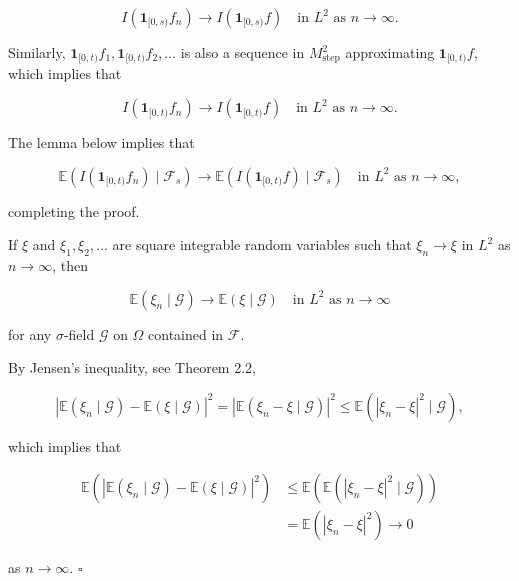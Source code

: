 \begin{Proof}
\begin{enumerate}
\begin{equation}
I\left(\mathbf{1}_{[0,s)} f_n\right) \to I\left(\mathbf{1}_{[0,s)} f\right) \quad \text{in } L^2 \text{ as } n \to \infty.
\end{equation}

Similarly, $\mathbf{1}_{[0,t)} f_1, \mathbf{1}_{[0,t)} f_2, \ldots$ is also a sequence in $M_{\mathrm{step}}^2$ approximating $\mathbf{1}_{[0,t)} f$, which implies that

\begin{equation}
I\left(\mathbf{1}_{[0,t)} f_n\right) \to I\left(\mathbf{1}_{[0,t)} f\right) \quad \text{in } L^2 \text{ as } n \to \infty.
\end{equation}

The lemma below implies that

\begin{equation}
\mathbb{E}\left(I\left(\mathbf{1}_{[0,t)} f_n\right) \mid \mathcal{F}_s\right) \to \mathbb{E}\left(I\left(\mathbf{1}_{[0,t)} f\right) \mid \mathcal{F}_s\right) \quad \text{in } L^2 \text{ as } n \to \infty,
\end{equation}

completing the proof.
\end{enumerate}
\end{Proof}

\begin{Lemma}
\label{lm:7.1}
If $\xi$ and $\xi_1, \xi_2, \ldots$ are square integrable random variables such that $\xi_n \to \xi$ in $L^2$ as $n \to \infty$, then

\begin{equation}
\mathbb{E}\left(\xi_n \mid \mathcal{G}\right) \to \mathbb{E}\left(\xi \mid \mathcal{G}\right) \quad \text{in } L^2 \text{ as } n \to \infty
\end{equation}

for any $\sigma$-field $\mathcal{G}$ on $\Omega$ contained in $\mathcal{F}$.
\end{Lemma}

\begin{Proof}
By Jensen's inequality, see Theorem 2.2,

\begin{equation}
\left|\mathbb{E}\left(\xi_n \mid \mathcal{G}\right) - \mathbb{E}\left(\xi \mid \mathcal{G}\right)\right|^2 = \left|\mathbb{E}\left(\xi_n - \xi \mid \mathcal{G}\right)\right|^2 \leq \mathbb{E}\left(|\xi_n - \xi|^2 \mid \mathcal{G}\right),
\end{equation}

which implies that

\begin{align}
\mathbb{E}\left(\left|\mathbb{E}\left(\xi_n \mid \mathcal{G}\right) - \mathbb{E}\left(\xi \mid \mathcal{G}\right)\right|^2\right) & \leq \mathbb{E}\left(\mathbb{E}\left(|\xi_n - \xi|^2 \mid \mathcal{G}\right)\right) \\
& = \mathbb{E}\left(|\xi_n - \xi|^2\right) \to 0
\end{align}

as $n \to \infty$. \hfill $\square$
\end{Proof}

